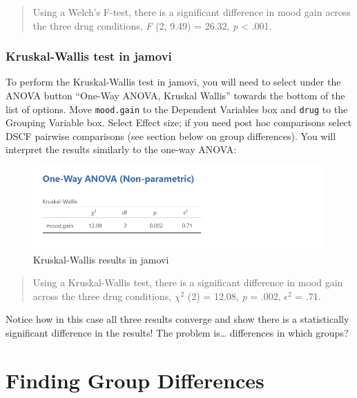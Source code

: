 \documentclass[
]{book}
\begin{document}
\begin{quote}
Using a Welch's F-test, there is a significant difference in mood gain across the three drug conditions, \emph{F} (2, 9.49) = 26.32, \emph{p} \textless{} .001.
\end{quote}

\hypertarget{kruskal-wallis-test-in-jamovi}{%
\subsubsection{Kruskal-Wallis test in jamovi}\label{kruskal-wallis-test-in-jamovi}}

To perform the Kruskal-Wallis test in jamovi, you will need to select under the ANOVA button ``One-Way ANOVA, Kruskal Wallis'' towards the bottom of the list of options. Move \texttt{mood.gain} to the Dependent Variables box and \texttt{drug} to the Grouping Variable box. Select Effect size; if you need post hoc comparisons select DSCF pairwise comparisons (see section below on group differences). You will interpret the results similarly to the one-way ANOVA:

\begin{figure}

{\centering \includegraphics[width=1\linewidth]{images/04_one-way-anova/one-way_results_Kruskal} 

}

\caption{Kruskal-Wallis results in jamovi}\label{fig:unnamed-chunk-8}
\end{figure}

\begin{quote}
Using a Kruskal-Wallis test, there is a significant difference in mood gain across the three drug conditions, \(\chi^2\) (2) = 12.08, \emph{p} = .002, \(\epsilon^2\) = .71.
\end{quote}

Notice how in this case all three results converge and show there is a statistically significant difference in the results! The problem is\ldots{} differences in which groups?

\hypertarget{finding-group-differences}{%
\section{Finding Group Differences}\label{finding-group-differences}}
\end{document}
